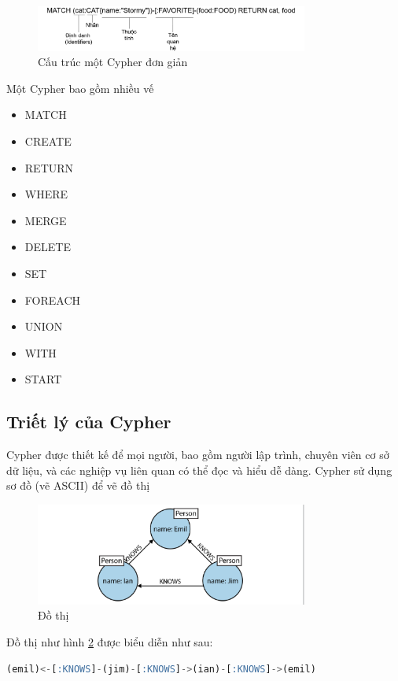 \begin{figure}[h]
\centering
\includegraphics[width=0.8\textwidth]{image/chap2cypher.png}
\caption{\label{fig:cypher} Cấu trúc một Cypher đơn giản }
\end{figure}

Một Cypher bao gồm nhiều vế 
\begin{itemize}
\item MATCH 
\item CREATE 
\item RETURN
\item WHERE
\item MERGE
\item DELETE
\item SET
\item FOREACH 
\item UNION
\item WITH 
\item START
\end{itemize}

\subsection{Triết lý của Cypher} \cite{robinson2013graph}
\label{sec:cypherpil}
Cypher được thiết kế để mọi người, bao gồm người lập trình, chuyên viên cơ sở dữ liệu, và các nghiệp vụ liên quan có thể đọc và hiểu dễ dàng. Cypher sử dụng sơ đồ (vẽ ASCII) để vẽ đồ thị

\begin{figure}[h]
\centering
\includegraphics[width=0.8\textwidth]{image/chap3graphdiagram.png}
\caption{\label{fig:graphdiagram} Đồ thị}
\end{figure}

Đồ thị như hình \ref{fig:graphdiagram} được biểu diễn như sau: 

\begin{lstlisting}[caption={Cypher}, label={lst:cypherjim1}, language=SQL]
(emil)<-[:KNOWS]-(jim)-[:KNOWS]->(ian)-[:KNOWS]->(emil) 
\end{lstlisting}

